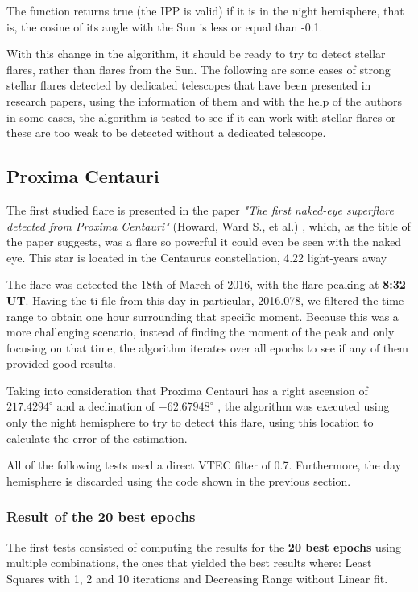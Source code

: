 The function returns true (the IPP is valid) if it is in the night hemisphere, that is, the cosine of its angle with the Sun is less or equal than -0.1.

With this change in the algorithm, it should be ready to try to detect stellar flares, rather than flares from the Sun. The following are some cases of strong stellar flares detected by dedicated telescopes that have been presented in research papers, using the information of them and with the help of the authors in some cases, the algorithm is tested to see if it can work with stellar flares or these are too weak to be detected without a dedicated telescope. 

\subsection{Proxima Centauri}

The first studied flare is presented in the paper \textit{"The first naked-eye superflare detected from Proxima Centauri"} (Howard, Ward S., et al.) \cite{howard2018first}, which, as the title of the paper suggests, was a flare so powerful it could even be seen with the naked eye. This star is located in the Centaurus constellation, 4.22 light-years away

The flare was detected the 18th of March of 2016, with the flare peaking at\textbf{ 8:32 UT}. Having the ti file from this day in particular, 2016.078, we filtered the time range to obtain one hour surrounding that specific moment. Because this was a more challenging scenario, instead of finding the moment of the peak and only focusing on that time, the algorithm iterates over all epochs to see if any of them provided good results.

Taking into consideration that Proxima Centauri has a right ascension of $217.4294^{\circ}$ and a declination of $-62.67948^{\circ}$ \cite{proximawiki}, the algorithm was executed using only the night hemisphere to try to detect this flare, using this location to calculate the error of the estimation. 

All of the following tests used a direct VTEC filter of 0.7. Furthermore, the day hemisphere is discarded using the code shown in the previous section.

\subsubsection{Result of the 20 best epochs}

The first tests consisted of computing the results for the \textbf{20 best epochs} using multiple combinations, the ones that yielded the best results where: Least Squares with 1, 2 and 10 iterations and Decreasing Range without Linear fit. 

